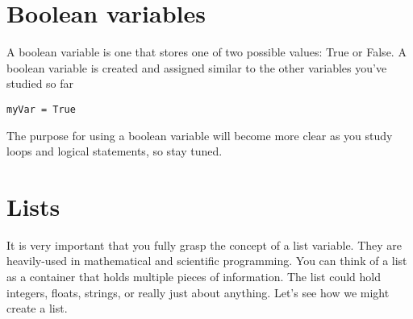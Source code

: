 \section{Boolean variables}
A boolean variable is one that stores one of two possible values: True
or False.  A boolean variable is created and assigned similar to the
other variables you've studied so far
\begin{Verbatim}
myVar = True
\end{Verbatim}
The purpose for using a boolean variable will become more clear as you
study loops and logical statements, so stay tuned.

\section{Lists}
It is very important that you fully grasp the concept of a list
variable.  They are heavily-used in mathematical and scientific
programming.  You can think of a list as a container that holds
multiple pieces of information. The list could hold integers, floats,
strings, or really just about anything.  Let's see how we might create
a list.

